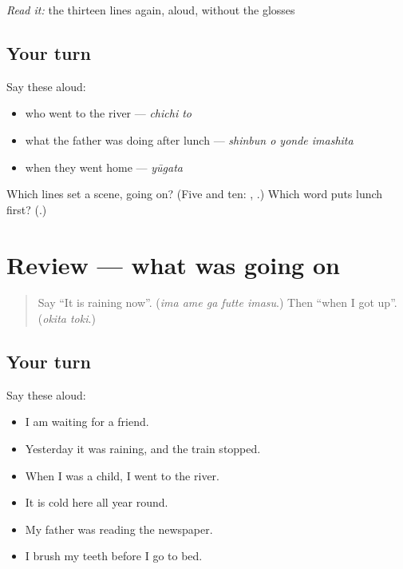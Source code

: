 \begin{tcolorbox}[breakable,skin=enhanced,colback=orange!6,colframe=orange!45!black,boxrule=0.5pt,arc=1mm,left=6pt,right=6pt,top=4pt,bottom=4pt,fonttitle=\bfseries,title={Read this}]
\emph{Read it:} the thirteen lines again, aloud, without the glosses
\end{tcolorbox}

\subsection*{Your turn}
Say these aloud:

\begin{itemize}
\raggedright
  \item who went to the river — \emph{chichi to}
  \item what the father was doing after lunch — \emph{shinbun o yonde imashita}
  \item when they went home — \emph{yūgata}
\end{itemize}

\begin{tcolorbox}[breakable,colback=teal!4,colframe=teal!35!black,title={Before you move on}]
Which lines set a scene, going on? (Five and ten: \textbf{}, \textbf{}.) Which word puts lunch first? (\textbf{}.)
\end{tcolorbox}
\section[(review)]{Review — what was going on}

\label{lesson:JA-R253-what-was-going-on}



\begin{quote}
Say \textquotedblleft{}It is raining now\textquotedblright{}. (\emph{ima ame ga futte imasu}.) Then \textquotedblleft{}when I got up\textquotedblright{}. (\emph{okita toki}.)
\end{quote}

\subsection*{Your turn}
Say these aloud:

\begin{itemize}
\raggedright
  \item I am waiting for a friend.
  \item Yesterday it was raining, and the train stopped.
  \item When I was a child, I went to the river.
  \item It is cold here all year round.
  \item My father was reading the newspaper.
  \item I brush my teeth before I go to bed.
\end{itemize}

